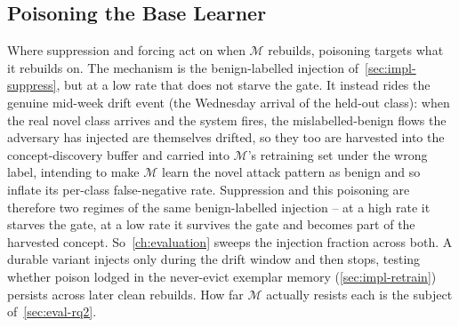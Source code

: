\subsection{Poisoning the Base Learner}
\label{sec:impl-poison}
Where suppression and forcing act on when $\mathcal{M}$ rebuilds, poisoning targets what it rebuilds on. The mechanism is the benign-labelled injection of~\cref{sec:impl-suppress}, but at a low rate that does not starve the gate. It instead rides the genuine mid-week drift event (the Wednesday arrival of the held-out class): when the real novel class arrives and the system fires, the mislabelled-benign flows the adversary has injected are themselves drifted, so they too are harvested into the concept-discovery buffer and carried into $\mathcal{M}$'s retraining set under the wrong label, intending to make $\mathcal{M}$ learn the novel attack pattern as benign and so inflate its per-class false-negative rate. Suppression and this poisoning are therefore two regimes of the same benign-labelled injection -- at a high rate it starves the gate, at a low rate it survives the gate and becomes part of the harvested concept. So~\cref{ch:evaluation} sweeps the injection fraction across both. A durable variant injects only during the drift window and then stops, testing whether poison lodged in the never-evict exemplar memory (\cref{sec:impl-retrain}) persists across later clean rebuilds. How far $\mathcal{M}$ actually resists each is the subject of~\cref{sec:eval-rq2}.

